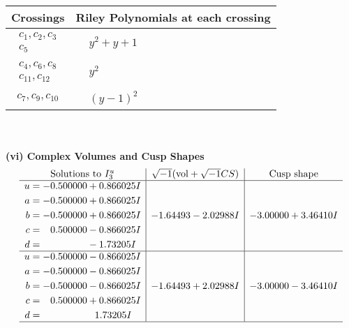 \documentclass[1p]{elsarticle_modified}
\theoremstyle{definition}
\newcommand{\I}{\sqrt{-1}}
\begin{document}
\begin{tabular}{m{50pt}|m{274pt}}
Crossings & \hspace{64pt}Riley Polynomials at each crossing \\
\hline $$\begin{aligned}c_{1},c_{2},c_{3}\\c_{5}\end{aligned}$$&$\begin{aligned}
&y^2+y+1
\end{aligned}$\\
\hline $$\begin{aligned}c_{4},c_{6},c_{8}\\c_{11},c_{12}\end{aligned}$$&$\begin{aligned}
&y^2
\end{aligned}$\\
\hline $$\begin{aligned}c_{7},c_{9},c_{10}\end{aligned}$$&$\begin{aligned}
&(y-1)^2
\end{aligned}$\\
\hline
\end{tabular}\\~\\
\newpage\flushleft \textbf{(vi) Complex Volumes and Cusp Shapes}
$$\begin{array}{c|c|c}  
\text{Solutions to }I^u_{3}& \I (\text{vol} + \sqrt{-1}CS) & \text{Cusp shape}\\
 \hline 
\begin{aligned}
u &= -0.500000 + 0.866025 I \\
a &= -0.500000 + 0.866025 I \\
b &= -0.500000 + 0.866025 I \\
c &= \phantom{-}0.500000 - 0.866025 I \\
d &= \phantom{-0.000000 } -1.73205 I\end{aligned}
 & -1.64493 - 2.02988 I & -3.00000 + 3.46410 I \\ \hline\begin{aligned}
u &= -0.500000 - 0.866025 I \\
a &= -0.500000 - 0.866025 I \\
b &= -0.500000 - 0.866025 I \\
c &= \phantom{-}0.500000 + 0.866025 I \\
d &= \phantom{-0.000000 -}1.73205 I\end{aligned}
 & -1.64493 + 2.02988 I & -3.00000 - 3.46410 I\\
 \hline 
 \end{array}$$\newpage\newpage\renewcommand{\arraystretch}{1}
\end{document}
